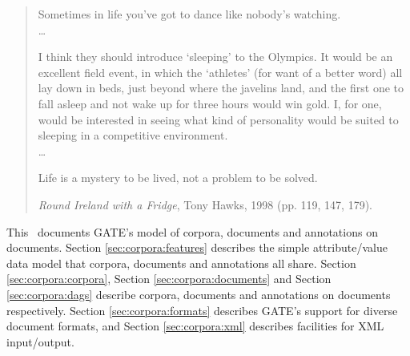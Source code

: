 %
%
%
%


\nnormalsize
\ifprintedbook \else
\begin{quote}
Sometimes in life you've got to dance like nobody's watching.
\\
\ldots

I think they should introduce `sleeping' to the Olympics. It would be an 
excellent field event, in which the `athletes' (for want of a better word)
all lay down in beds, just beyond where the javelins land,
and the first one to fall asleep and not wake up for three hours
would win gold. I, for one, would be interested in seeing what kind of
personality would be suited to sleeping in a competitive environment.
\\
\ldots

Life is a mystery to be lived, not a problem to be solved.

{\it Round Ireland with a Fridge}, Tony Hawks, 1998 (pp. 119, 147, 179).
\end{quote}
\fi

This \chapthing\ documents GATE's model of corpora, documents and annotations
on documents. Section \ref{sec:corpora:features} describes the simple
attribute/value data model that corpora, documents and annotations all share. Section
\ref{sec:corpora:corpora}, Section \ref{sec:corpora:documents} and Section
\ref{sec:corpora:dags} describe corpora, documents and annotations on documents
respectively. Section \ref{sec:corpora:formats} describes GATE's support for
diverse document formats, and Section \ref{sec:corpora:xml} describes
facilities for XML input/output.



